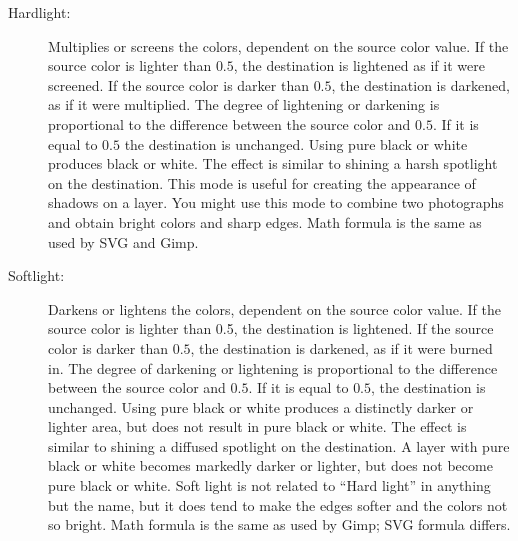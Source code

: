 \begin{description}
    \item[Hardlight:] Multiplies or screens the colors, dependent on the source color value.  If the source color is lighter than $0.5$, the destination is lightened as if it were screened.  If the source color is darker than $0.5$, the destination is darkened, as if it were multiplied.  The degree of lightening or darkening is proportional to the difference between the source color and $0.5$.  If it is equal to $0.5$ the destination is unchanged.  Using pure black or white produces black or white.  The effect is similar to shining a harsh spotlight on the destination.  This mode is useful for creating the appearance of shadows on a layer.  You might use this mode to combine two photographs and obtain bright colors and sharp edges.  Math formula is the same as used by SVG and Gimp.
    \item[Softlight:] Darkens or lightens the colors, dependent on the source color value.  If the source color is lighter than 0.5, the destination is lightened. If the source color is darker than $0.5$, the destination is darkened, as if it were burned in.  The degree of darkening or lightening is proportional to the difference between the source color and $0.5$.  If it is equal to $0.5$, the destination is unchanged.  Using pure black or white produces a distinctly darker or lighter area, but does not result in pure black or white.  The effect is similar to shining a diffused spotlight on the destination.  A layer with pure black or white becomes markedly darker or lighter, but does not become pure black or white.  Soft light is not related to “Hard light” in anything but the name, but it does tend to make the edges softer and the colors not so bright.   Math formula is the same as used by Gimp; SVG formula differs.
\end{description}


